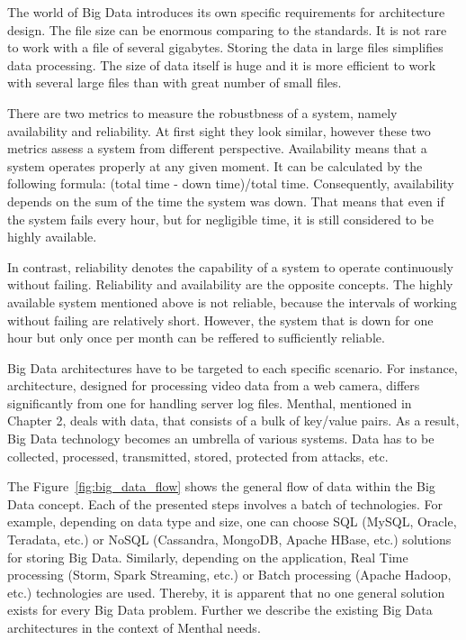 The world of Big Data introduces its own specific requirements for architecture design.
The file size can be enormous comparing to the standards.
It is not rare to work with a file of several gigabytes.
Storing the data in large files simplifies data processing.
The size of data itself is huge and it is more efficient to work with several large files than with great number of small files.

There are two metrics to measure the robustbness of a system, namely availability and reliability.
At first sight they look similar, however these two metrics assess a system from different perspective.
Availability means that a system operates properly at any given moment.
It can be calculated by the following formula: (total time - down time)/total time.
Consequently, availability depends on the sum of the time the system was down.
That means that even if the system fails every hour, but for negligible time, it is still considered to be highly available.

In contrast, reliability denotes the capability of a system to operate continuously without failing.
Reliability and availability are the opposite concepts.
The highly available system mentioned above is not reliable, because the intervals of working without failing are relatively short.
However, the system that is down for one hour but only once per month can be reffered to sufficiently reliable.

Big Data architectures have to be targeted to each specific scenario.
For instance, architecture, designed for processing video data from a web camera, differs significantly from one for handling server log files.
Menthal, mentioned in Chapter 2, deals with data, that consists of a bulk of key/value pairs. 
As a result, Big Data technology becomes an umbrella of various systems. 
Data has to be collected, processed, transmitted, stored, protected from attacks, etc.

The Figure~\ref{fig:big_data_flow} shows the general flow of data within the Big Data concept.
Each of the presented steps involves a batch of technologies.
For example, depending on data type and size, one can choose SQL (MySQL, Oracle, Teradata, etc.) or NoSQL (Cassandra, MongoDB, Apache HBase, etc.) solutions for storing Big Data.
Similarly, depending on the application, Real Time processing (Storm, Spark Streaming, etc.) or Batch processing (Apache Hadoop, etc.) technologies are used. 
Thereby, it is apparent that no one general solution exists for every Big Data problem.
Further we describe the existing Big Data architectures in the context of Menthal needs.

